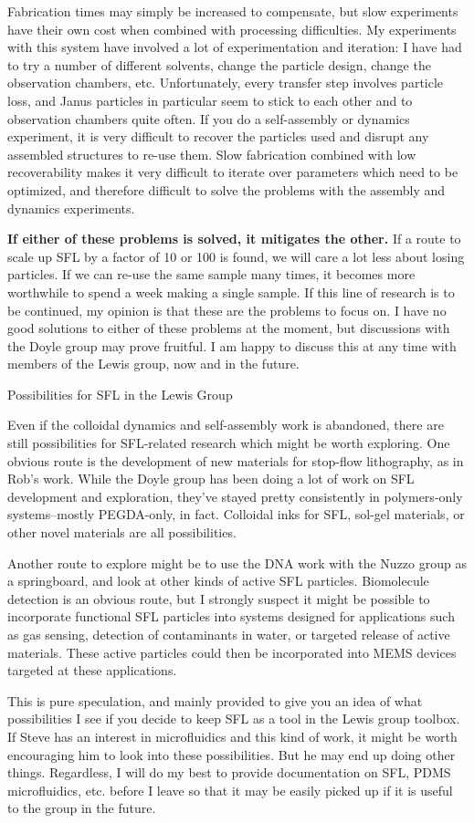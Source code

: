 \documentclass[11pt]{article}
\newcommand{\bigsection}[1]{	
	\vspace{4pt}
	{\fontfamily{phv}\selectfont\Large#1}

}
\begin{document}
Fabrication times may simply be increased to compensate, but slow experiments have their own cost when combined with processing difficulties.  My experiments with this system have involved a lot 
of experimentation and iteration: I have had to try a number of different solvents, change the particle design, change the observation chambers, etc.  Unfortunately, every transfer step involves particle 
loss, and Janus particles in particular seem to stick to each other and to observation chambers quite often.  If you do a self-assembly or dynamics experiment, it is very difficult to 
recover the particles used and disrupt any assembled structures to re-use them.  Slow fabrication combined with low recoverability makes it very difficult to iterate over parameters which need to
be optimized, and therefore difficult to solve the problems with the assembly and dynamics experiments.

\textbf{If either of these problems is solved, it mitigates the other.} If a route to scale up SFL by a factor of 10 or 100 is found, we will care a lot less about losing particles.
If we can re-use the same sample many times, it becomes more worthwhile to spend a week making a single sample.  If this line of research is to be continued, my opinion is that these
are the problems to focus on.
I have no good solutions to either of these problems at the moment, but discussions with the Doyle group may prove fruitful.  I am happy to discuss this at any time with
members of the Lewis group, now and in the future.


\bigsection{Possibilities for SFL in the Lewis Group}

Even if the colloidal dynamics and self-assembly work is abandoned, there are still possibilities for SFL-related research which might be worth exploring.
One obvious route is the development of new materials for stop-flow lithography, as in Rob's work.  While the Doyle group has been doing a lot of work on 
SFL development and exploration, they've stayed pretty consistently in polymers-only systems--mostly PEGDA-only, in fact.  Colloidal inks for SFL, sol-gel 
materials, or other novel materials are all possibilities.

Another route to explore might be to use the DNA work with the Nuzzo group as a springboard, and look at other kinds of active SFL particles.  Biomolecule 
detection is an obvious route, but I strongly suspect it might be possible to incorporate functional SFL particles into systems designed for applications 
such as gas sensing, detection of contaminants in water, or targeted release of active materials.  These active particles could then be incorporated into MEMS
devices targeted at these applications.

This is pure speculation, and mainly provided to give you an idea of what possibilities I see if you decide to keep SFL as a tool in the Lewis group toolbox.
If Steve has an interest in microfluidics and this kind of work, it might be worth encouraging him to look into these possibilities.  But he may end up doing other
things.  Regardless, I will do my best to provide documentation on SFL, PDMS microfluidics, etc. before I leave so that it may be easily picked up if it is useful
to the group in the future.
\end{document}
